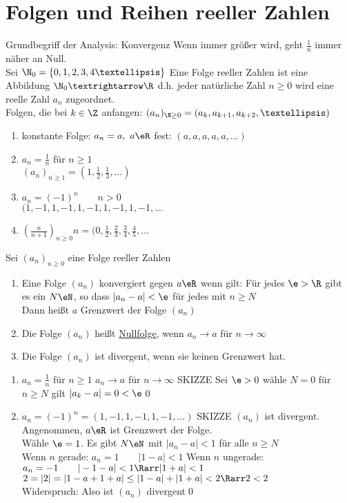 \chapter{Folgen und Reihen reeller Zahlen}
Grundbegriff der Analysis: Konvergenz
\bsp
Wenn \nN{} immer größer wird, geht $\frac{1}{n}$ immer näher an Null.\\
Sei $\N_0=\{0,1,2,3,4…\}$
\Def
Eine Folge reeller Zahlen ist eine Abbildung $\N_0→\R$ d.h. jeder natürliche Zahl $n\geq 0$ wird eine reelle Zahl $a_n$ zugeordnet.\\
Folgen, die bei $k\in\Z$ anfangen: $(a_n)_{\N\geq 0}=(a_k,a_{k+1},a_{k+2},…)$
\bsp
\begin{enumerate}
\item{konstante Folge: $a_n=a,\ a\eR$ fest: $(a,a,a,a,a,…)$}
\item{$a_n=\frac{1}{n}$ für $n\geq 1$\\
$(a_n)_{n\geq 1}=(1,\frac{1}{2},\frac{1}{3},…)$}
\item{$a_n=(-1)^n\qquad n>0$\\
$(1,-1,1,-1,1,-1,1,-1,1,-1,…$}
\item{$(\frac{n}{n+1})_{n\geq 0}n=(0,\frac{1}{2},\frac{2}{3},\frac{3}{4},\frac{4}{5},…$}
\end{enumerate}
%
\Def
Sei $(a_n)_{n\geq 0}$ eine Folge reeller Zahlen
\begin{enumerate}
\item{Eine Folge $(a_n)$ konvergiert gegen $a\eR$ wenn gilt: Für jedes $\e>\R$ gibt es ein $N\eN$, so dass $|a_n-a|<\e$ für jedes \nN{} mit $n\geq N$\\
Dann heißt $a$ Grenzwert der Folge $(a_n)$\\
}
\item{Die Folge $(a_n)$ heißt \underline{Nullfolge}, wenn $a_n→a$ für $n→∞$}
\item{Die Folge $(a_n)$ ist divergent, wenn sie keinen Grenzwert hat.}
\end{enumerate}
%
\bsp
\begin{enumerate}
\item{$a_n=\frac{1}{n}$ für $n\geq 1$
 $a_n→a$ für $n→∞$ SKIZZE %
\bew
Sei $\e>0$ wähle $N=0$ für $n\geq N$ gilt $|a_k-a|=0<\e$\qed}
\item{$a_n=(-1)^n=(1,-1,1,-1,1,-1,…)$ SKIZZE %
 $(a_n)$ ist divergent. 
\bew
Angenommen, $a\eR$ ist Grenzwert der Folge.\\
Wähle $\e=1$. Es gibt $N\eN$ mit $|a_n-a|<1$ für alle $n\geq N$\\
Wenn $n$ gerade: $a_n=1\qquad |1-a|<1$
Wenn $n$ ungerade: $a_n=-1\qquad |-1-a|<1 \Rarr |1+a|<1$\\
$2=|2|=|1-a+1+a|\leq |1-a|+|1+a|<2 \Rarr 2<2$\\
Widerspruch: Also ist $(a_n)$ divergent\qed}
\end{enumerate}
